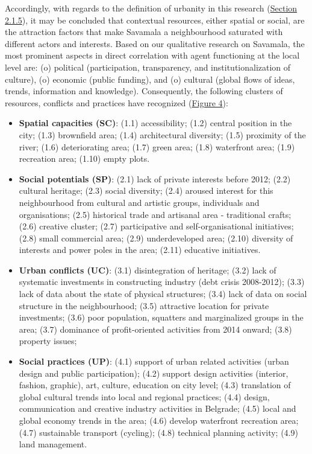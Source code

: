 \documentclass[11pt]{report}
\begin{document}
Accordingly, with regards to the definition of urbanity in this research (\href{Section 2.1.5}{Section 2.1.5}), it may be concluded that contextual resources, either spatial or social, are the attraction factors that make Savamala a neighbourhood saturated with different actors and interests.
Based on our qualitative research on Savamala, the most prominent aspects in direct correlation with agent functioning at the local level are:
(o) political (participation, transparency, and institutionalization of culture),
(o) economic (public funding),
and
(o) cultural (global flows of ideas, trends, information and knowledge).
Consequently, the following clusters of resources, conflicts and practices have recognized (\href{Figure 4}{Figure 4}):

\begin{itemize}

\item \textbf{Spatial capacities (SC)}: 
(1.1) accessibility;
(1.2) central position in the city;
(1.3) brownfield area;
(1.4) architectural diversity;
(1.5) proximity of the river;
(1.6) deteriorating area;
(1.7) green area;
(1.8) waterfront area;
(1.9) recreation area;
(1.10) empty plots.

\item \textbf{Social potentials (SP)}:
(2.1) lack of private interests before 2012;
(2.2) cultural heritage;
(2.3) social diversity;
(2.4) aroused interest for this neighbourhood from cultural and artistic groups, individuals and organisations;
(2.5) historical trade and artisanal area - traditional crafts;
(2.6) creative cluster;
(2.7) participative and self-organisational initiatives;
(2.8) small commercial area;
(2.9) underdeveloped area;
(2.10) diversity of interests and power poles in the area;
(2.11) educative initiatives.

\item \textbf{Urban conflicts (UC)}:
(3.1) disintegration of heritage;
(3.2) lack of systematic investments in constructing industry (debt crisis 2008-2012);
(3.3) lack of data about the state of physical structures;
(3.4) lack of data on social structure in the neighbourhood;
(3.5) attractive location for private investments;
(3.6) poor population, squatters and marginalized groups in the area;
(3.7) dominance of profit-oriented activities from 2014 onward;
(3.8) property issues;

\item \textbf{Social practices (UP)}:
(4.1) support of urban related activities (urban design and public participation);
(4.2) support design activities (interior, fashion, graphic), art, culture, education on city level;
(4.3) translation of global cultural trends into local and regional practices;
(4.4) design, communication and creative industry activities in Belgrade;
(4.5) local and global economy trends in the area;
(4.6) develop waterfront recreation area;
(4.7) sustainable transport (cycling);
(4.8) technical planning activity;
(4.9) land management.
\end{itemize}
\end{document}
